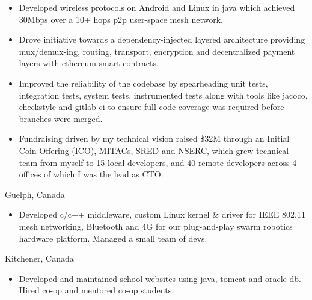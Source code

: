 \documentclass[10pt,a4paper,ragged2e,withhyper]{altacv}
\begin{document}
\begin{paracol}{2}
\begin{itemize}
\item Developed wireless protocols on Android and Linux in java which achieved 30Mbps over a 10+ hops p2p user-space mesh network.
\item Drove initiative towards a dependency-injected layered architecture providing mux/demux-ing, routing, transport, encryption and decentralized payment layers with ethereum smart contracts.
\item Improved the reliability of the codebase by spearheading unit tests, integration tests, system tests, instrumented tests along with tools like jacoco, checkstyle and gitlab-ci to ensure full-code coverage was required before branches were merged.
\item Fundraising driven by my technical vision raised \$32M through an Initial Coin Offering (ICO), MITACs, SRED and NSERC, which grew technical team from myself to 15 local developers, and 40 remote developers across 4 offices of which I was the lead as CTO.
\end{itemize}

 {Guelph, Canada}
\begin{itemize}
\item Developed c/c++ middleware, custom Linux kernel \& driver for IEEE 802.11 mesh networking, Bluetooth and 4G for our plug-and-play swarm robotics hardware platform. Managed a small team of devs.
\end{itemize}

 {Kitchener, Canada}
\begin{itemize}
\item Developed and maintained school websites using java, tomcat and oracle db. Hired co-op and mentored co-op students.
\end{itemize}




\end{paracol}
\end{document}
